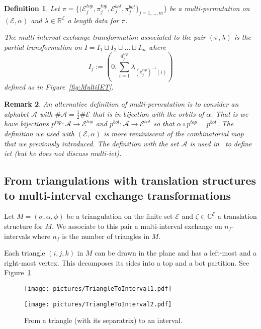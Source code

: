 \documentclass{article}
\def\RR{\mathbb{R}}
\def\CC{\mathbb{C}}
\def\cA{\mathcal{A}}
\def\cE{\mathcal{E}}
\newtheorem{definition}{Definition}
\newtheorem{remark}[definition]{Remark}
\begin{document}
\begin{definition}
Let $\pi = \{(\cE^{top}_j, \pi^{top}_j, \cE^{bot}_j, \pi^{bot}_j\}_{j=1,\ldots,m}\}$
be a multi-permutation on $(\cE, \alpha)$ and $\lambda \in \RR^\cE$
a length data for $\pi$.

The \emph{multi-interval exchange transformation} associated to the pair $(\pi,\lambda)$
is the partial transformation on $I = I_1 \sqcup I_2 \sqcup \ldots \sqcup I_m$ where
\[
I_j := \left(0, \sum_{i=1}^{d_j^{top}} \lambda_{(\pi^{top}_j)^{-1}(i)} \right)
\]
defined as in Figure~\ref{fig:MultiIET}.
\end{definition}

\begin{remark}
An alternative definition of multi-permutation is to consider an alphabet $\cA$
with $\# \cA = \frac{1}{2} \# \cE$ that is in bijection with the orbits of
$\alpha$. That is we have bijections $p^{top}: \cA \to \cE^{top}$ and
$p^{bot}: \cA \to \cE^{bot}$ so that $\alpha \circ p^{top} = p^{bot}$.
The definition we used with $(\cE, \alpha)$ is more reminiscent of
the combinatorial map that we previously introduced. The definition with the set
$\cA$ is used in~\cite{Yoccoz} to define iet (but he does not discuss multi-iet).
\end{remark}

\subsection{From triangulations with translation structures to multi-interval exchange transformations}
Let $M = (\sigma, \alpha, \phi)$ be a triangulation on
the finite set $\cE$ and $\zeta \in \CC^\cE$ a translation structure for $M$.
We associate to this pair a multi-interval exchange on
$n_f$-intervals where $n_f$ is the number of triangles in $M$.

Each triangle $(i,j,k)$ in $M$ can be drawn in the plane and has a left-most and
a right-most vertex. This decomposes its sides into a top and a bot partition.
See Figure~\ref{fig:FromTrianglesToIntervals}
\begin{figure}[!ht]
\begin{minipage}{0.4\textwidth}
\begin{center}
\texttt{[image: pictures/TriangleToInterval1.pdf]}
\end{center}
\end{minipage}
\hspace{.1\textwidth}
\begin{minipage}{0.4\textwidth}
\begin{center}
\texttt{[image: pictures/TriangleToInterval2.pdf]}
\end{center}
\end{minipage}
\caption{From a triangle (with its separatrix) to an interval.}
\label{fig:FromTrianglesToIntervals}
\end{figure}
\end{document}
